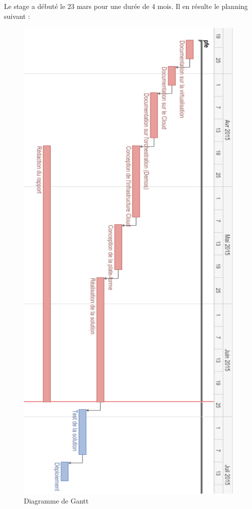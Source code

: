 \begin{onehalfspace}
Le stage a débuté le 23 mars pour une durée de 4 mois. Il en résulte le planning suivant :

\begin{figure}[H]
\centering
\includegraphics [scale=0.6]{chapitre1/assets/gantt.png}
\caption{Diagramme de Gantt}
\end{figure}


\end{onehalfspace}
